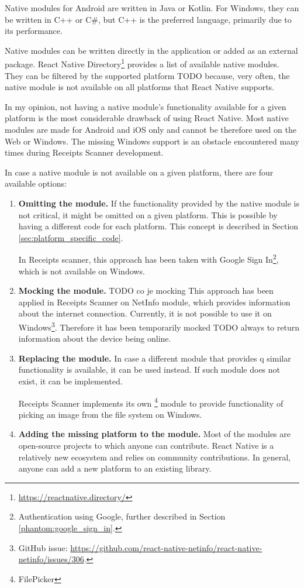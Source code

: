 \documentclass[
  digital, %
  table,   %
  oneside, %
  lof,     %
  lot,     %
]{fithesis3}
\begin{document}
Native modules for Android are written in Java or Kotlin.
For Windows, they can be written in C++ or C\#, but C++ is the preferred language, primarily due to its performance.

Native modules can be written directly in the application or added as an external package. React Native Directory\footnote{\url{https://reactnative.directory/}} provides a list of available native modules. They can be filtered by the supported platform TODO because, very often, the native module is not available on all platforms that React Native supports.

In my opinion, not having a native module's functionality available for a given platform is the most considerable drawback of using React Native.
Most native modules are made for Android and iOS only and cannot be therefore used on the Web or Windows. The missing Windows support is an obstacle encountered many times during Receipts Scanner development.

In case a native module is not available on a given platform, there are four available options:
\begin{enumerate}
    \item \textbf{Omitting the module.} 
    If the functionality provided by the native module is not critical, it might be omitted on a given platform. This is possible by having a different code for each platform. This concept is described in Section \ref{sec:platform_specific_code}.
    
    In Receipts scanner, this approach has been taken with Google Sign In\footnote{Authentication using Google, further described in Section \ref{phantom:google_sign_in}.}, which is not available on Windows.
    
    \item \textbf{Mocking the module.}
    TODO co je mocking
    This approach has been applied in Receipts Scanner on NetInfo module, which provides information about the internet connection. Currently, it is not possible to use it on Windows\footnote{GitHub issue: \url{https://github.com/react-native-netinfo/react-native-netinfo/issues/306}.}. Therefore it has been temporarily mocked TODO always to return information about the device being online.
    
    \item \textbf{Replacing the module.} In case a different module that provides q similar functionality is available, it can be used instead. If such module does not exist, it can be implemented.
    
    Receipts Scanner implements its own \footnote{FilePicker} module to provide functionality of picking an image from the file system on Windows.
    
    \item \textbf{Adding the missing platform to the module.}
    Most of the modules are open-source projects to which anyone can contribute. React Native is a relatively new ecosystem and relies on community contributions. In general, anyone can add a new platform to an existing library.
\end{enumerate}
\end{document}
